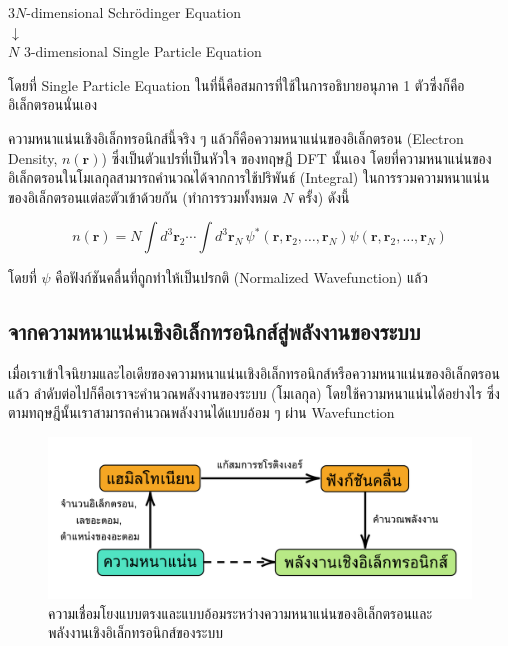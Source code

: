 \begin{framed}
    \centering
    $3N$-dimensional Schr\"{o}dinger Equation\\ $\downarrow$\\ $N$ $3$-dimensional Single Particle Equation
\end{framed}

\noindent โดยที่ Single Particle Equation ในที่นี้คือสมการที่ใช้ในการอธิบายอนุภาค 1 ตัวซึ่งก็คืออิเล็กตรอนนั่นเอง

ความหนาแน่นเชิงอิเล็กทรอนิกส์นี้จริง ๆ แล้วก็คือความหนาแน่นของอิเล็กตรอน (Electron Density, $n(\bm{r})$) ซึ่งเป็นตัวแปรที่เป็นหัวใจ%
ของทฤษฎี DFT นั้นเอง โดยที่ความหนาแน่นของอิเล็กตรอนในโมเลกุลสามารถคำนวณได้จากการใช้ปริพันธ์ (Integral) ในการรวมความหนาแน่น%
ของอิเล็กตรอนแต่ละตัวเข้าด้วยกัน (ทำการรวมทั้งหมด $N$ ครั้ง) ดังนี้

\begin{equation}\label{eq:elec_density}
    n(\bm{r}) = N \int{d}^{3} \bm{r}_{2} \cdots \int{d}^{3} \bm{r}_{N} \, 
                \psi^*(\bm{r}, \bm{r}_2, \dots, \bm{r}_N) \psi(\bm{r}, \bm{r}_2, 
                \dots, \bm{r}_N)
\end{equation}

\noindent โดยที่ $\psi$ คือฟังก์ชันคลื่นที่ถูกทำให้เป็นปรกติ (Normalized Wavefunction) แล้ว

\subsection{จากความหนาแน่นเชิงอิเล็กทรอนิกส์สู่พลังงานของระบบ}
\label{ssec:ener_density}

เมื่อเราเข้าใจนิยามและไอเดียของความหนาแน่นเชิงอิเล็กทรอนิกส์หรือความหนาแน่นของอิเล็กตรอนแล้ว ลำดับต่อไปก็คือเราจะคำนวณพลังงานของระบบ
(โมเลกุล) โดยใช้ความหนาแน่นได้อย่างไร ซึ่งตามทฤษฎีนั้นเราสามารถคำนวณพลังงานได้แบบอ้อม ๆ ผ่าน Wavefunction 

\begin{figure}[htbp]
    \centering
    \includegraphics[width=0.9\linewidth]{fig/density_wavefunc_ener.png}
    \caption{ความเชื่อมโยงแบบตรงและแบบอ้อมระหว่างความหนาแน่นของอิเล็กตรอนและพลังงานเชิงอิเล็กทรอนิกส์ของระบบ}
    \label{fig:density_wavefunc_ener}
\end{figure}

